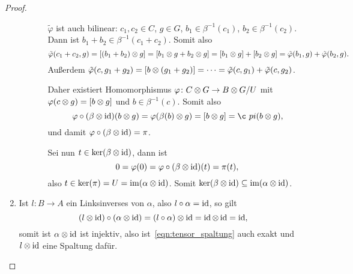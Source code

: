 \begin{proof}
\begin{enumerate}
\begin{enumerate}
\begin{enumerate}[($\alpha$)]
              $\tilde \varphi$ ist auch bilinear: $c_1,c_2 \in C$, $g \in G$, $b_1 \in \beta^{-1}(c_1)$, $b_2 \in \beta^{-1}(c_2)$.
              Dann ist $b_1 + b_2 \in \beta^{-1}(c_1 + c_2)$.
              Somit also
              \begin{equation*}
                \tilde \varphi(c_1+c_2, g) = [ (b_1 + b_2) \otimes g ] = [ b_1 \otimes g + b_2 \otimes g ]= [b_1 \otimes g] + [b_2 \otimes g] = \tilde \varphi (b_1,g) + \tilde \varphi (b_2, g).
              \end{equation*}
              Außerdem $\tilde \varphi(c, g_1 + g_2) = [ b \otimes (g_1 + g_2) ] = \dotsb = \tilde \varphi(c,g_1) + \tilde \varphi(c,g_2)$.

              Daher existiert Homomorphismus $\varphi \colon C \otimes G \to B \otimes G / U$ mit $\varphi(c \otimes g) = [b \otimes g]$ und $b \in \beta^{-1}(c)$.
              Somit also
              \begin{equation*}
                \varphi \circ (\beta \tensor \id) (b \tensor g) = \varphi (\beta(b) \tensor g) = [b \tensor g] = ¸pi (b \tensor g),
              \end{equation*}
              und damit $\varphi \circ (\beta \otimes \operatorname{id}) = \pi$.

              Sei nun $t \in \ker (\beta \otimes \operatorname{id})$, dann ist
              \begin{equation*}
                0 = \varphi(0) = \varphi \circ (\beta \otimes \operatorname{id}) (t) = \pi(t),
              \end{equation*}
              also $t \in \ker(\pi) = U = \operatorname{im}(\alpha \otimes \operatorname{id})$.
              Somit $\ker(\beta \otimes \operatorname{id}) \subseteq \operatorname{im} (\alpha \otimes \operatorname{id})$.
          \end{enumerate}
      \end{enumerate}
    \item
      Ist $l \colon B \to A$ ein Linksinverses von $\alpha$, also $l \circ \alpha = \operatorname{id}$, so gilt
      \begin{equation*}
        (l \otimes \operatorname{id}) \circ (\alpha \otimes \operatorname{id}) = (l \circ \alpha) \otimes \operatorname{id} = \operatorname{id} \otimes \operatorname{id} = \operatorname{id},
      \end{equation*}
      somit ist $\alpha \otimes \operatorname{id}$ ist injektiv, also ist~\eqref{eqn:tensor_spaltung} auch exakt und $l \otimes \operatorname{id}$ eine Spaltung dafür.
  \end{enumerate}
\end{proof}
